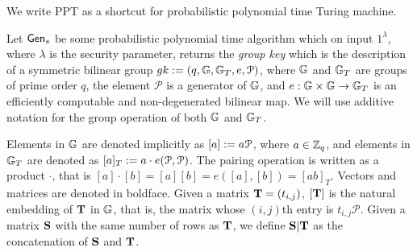 We write PPT as a shortcut for probabilistic polynomial time Turing machine.

Let $\mathsf{Gen}_s$ be some probabilistic polynomial time algorithm which on input $1^{\lambda}$, where $\lambda$ is the security parameter, returns the \emph{group key} which is the description of a symmetric bilinear group $gk:=(q,\mathbb{G},\mathbb{G}_T,e,\mathcal{P})$, where $\mathbb{G}$
and $\mathbb{G}_T$ are groups of prime order $q$, the element $\mathcal{P}$ is a generator of 
$\mathbb{G}$, and $e:\mathbb{G}\times\mathbb{G}\to\mathbb{G}_T$ is an efficiently computable and non-degenerated bilinear map. We will use additive notation for the group operation of both $\mathbb{G}$ and $\mathbb{G}_T$.

Elements in $\mathbb{G}$ are denoted implicitly as $[a]:=a \mathcal{P}$, where $a\in\mathbb{Z}_q$, and elements in $\mathbb{G}_T$ are denoted as $[a]_T:=a\cdot e(\mathcal{P},\mathcal{P})$. 
The pairing operation is written as a product $\cdot$, that is $[a] \cdot [b]=[a] [b]=e([a],[b])=[ab]_T$. Vectors and matrices are denoted in boldface. Given a matrix $\mathbf{{T}}=(t_{i,j})$, $[\mathbf{{T}}]$ is
the natural embedding of $\mathbf{{T}}$ in $\mathbb{G}$, that is, the matrix whose $(i,j)$th entry is $t_{i,j}\mathcal{P}$. Given a matrix $\mathbf{{S}}$ with the same number of rows as $\mathbf{{T}}$, we define $\mathbf{{S}}|\mathbf{{T}}$ as the concatenation of $\mathbf{{S}}$ and $\mathbf{{T}}$.
